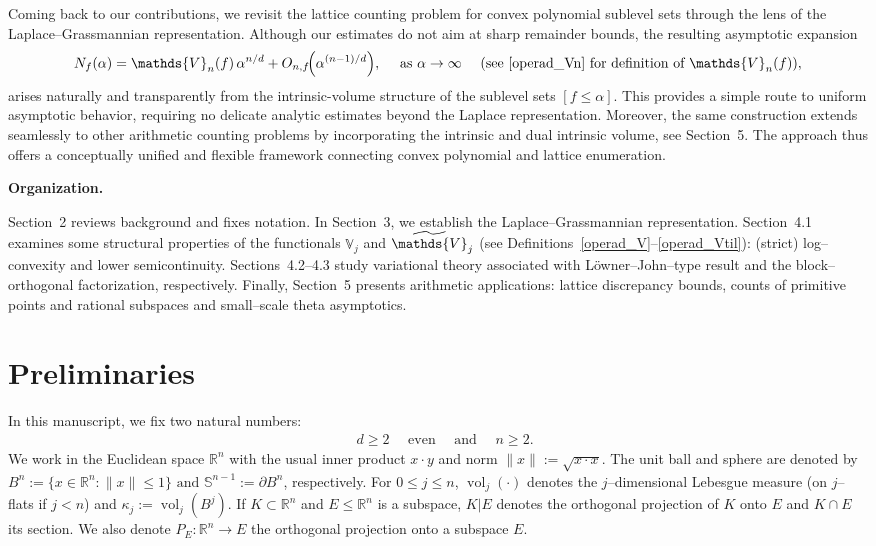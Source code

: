 \documentclass[11pt]{article}
\theoremstyle{definition}
\numberwithin{equation}{section}
\newcommand{\R}{\mathbb{R}}
\newcommand{\Sph}{\mathbb{S}}        %
\newcommand{\opV}{\mathds{V}}       %
\DeclareMathOperator{\vol}{vol}
\begin{document}
\begin{itemize}
    Coming back to our contributions, we revisit the lattice counting problem for convex polynomial sublevel sets through the lens of the Laplace--Grassmannian representation.
    Although our estimates do not aim at sharp remainder bounds, the resulting asymptotic expansion
    \[
    N_f(\alpha)
    = \opV_n(f)\,\alpha^{n/d}
      + O_{n, f}\!\Big(\alpha^{(n-1)/d}\Big),
      \quad \text{ as } \alpha \to \infty \quad \text{ (see \eqref{operad_Vn} for definition of $\opV_n(f)$)},
    \]
    arises naturally and transparently from the intrinsic-volume structure of the sublevel sets $[f \le \alpha]$.
    This provides a simple route to uniform asymptotic behavior, requiring no delicate analytic estimates beyond the Laplace representation.
    Moreover, the same construction extends seamlessly to other arithmetic counting problems by incorporating the intrinsic and dual intrinsic volume, see Section~5.
    The approach thus offers a conceptually unified and flexible framework connecting convex polynomial and lattice enumeration. 
\end{itemize}

\textbf{Organization.}

\medskip

Section~2 reviews background and fixes notation.
In Section~3, we establish the Laplace--Grassmannian representation. 
Section~4.1 examines some structural properties of the functionals $\opV_j$ and $\widetilde \opV_j$ (see Definitions~\eqref{operad_V}--\eqref{operad_Vtil}): (strict) log--convexity and lower semicontinuity.
Sections~4.2--4.3 study variational theory associated with L\"owner--John--type result and the block–orthogonal factorization, respectively. 
Finally, Section~5 presents arithmetic applications: lattice discrepancy bounds, counts of primitive points and rational subspaces and small--scale theta asymptotics.

\section{Preliminaries}

In this manuscript, we fix two natural numbers:
\begin{align*}
    \quad d \geq 2 \quad \text{ even} \quad \text{ and } \quad n \geq 2.
\end{align*}
We work in the Euclidean space $\R^n$ with the usual inner product $x\cdot y$ and norm $\|x\| :=\sqrt{x\cdot x}$.  
The unit ball and sphere are denoted by
$
B^n := \{x \in \R^n : \|x\| \le 1\} \text{ and } \Sph^{n-1} := \partial B^n
$, respectively.
For $0 \le j \le n$, $\vol_j(\cdot)$ denotes the $j$--dimensional Lebesgue measure (on $j$--flats if $j < n$) and $ \kappa_j := \vol_j(B^j)$.  
If $K \subset \R^n$ and $E \le \R^n$ is a subspace, $K|E$ denotes the orthogonal projection of $K$ onto $E$ and $K \cap E$ its section.  
We also denote $P_E : \R^n \to E$  the orthogonal projection onto a subspace $E$. 
\end{document}
